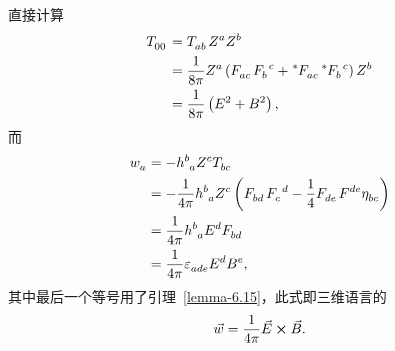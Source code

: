 \begin{xiti}
		\begin{zm}
			直接计算
			\begin{equation*}
				\begin{split}
					\tensor{T}{_0_0} &= \tensor{T}{_a_b} \tensor{Z}{^a} \tensor{Z}{^b}\\
					&= \frac{1}{8\pi} \tensor{Z}{^a} \left( \tensor{F}{_a_c} \tensor{F}{_b^c} + \tensor[^*]{F}{_a_c} \tensor[^*]{F}{_b^c} \right) \tensor{Z}{^b}\\
					&= \frac{1}{8\pi} \left( E^2 + B^2 \right),
				\end{split}
			\end{equation*}
			而
			\begin{equation*}
				\begin{split}
					\tensor{w}{_a} &= - \tensor{h}{^b_a} \tensor{Z}{^c} \tensor{T}{_b_c}\\
					&= - \frac{1}{4\pi} \tensor{h}{^b_a} \tensor{Z}{^c} \left( \tensor{F}{_b_d} \tensor{F}{_c^d} - \frac{1}{4} \tensor{F}{_d_e} \tensor{F}{^d^e} \tensor{\eta}{_b_c} \right)\\
					&= \frac{1}{4\pi} \tensor{h}{^b_a} \tensor{E}{^d} \tensor{F}{_b_d}\\
					&= \frac{1}{4\pi} \tensor{\varepsilon}{_a_d_e} \tensor{E}{^d} \tensor{B}{^e},
				\end{split}
			\end{equation*}
			其中最后一个等号用了引理~\ref{lemma-6.15}，此式即三维语言的
			\begin{equation*}
				\vec{w} = \frac{1}{4\pi} \vec{E} \cross \vec{B}.
			\end{equation*}


\end{zm}
\end{xiti}
